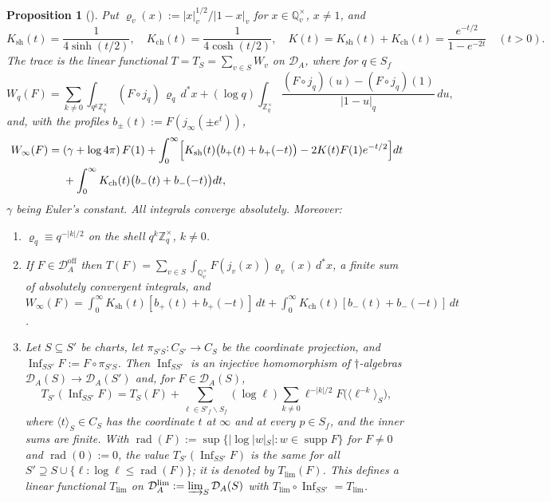 \documentclass[11pt]{amsart}
\newtheorem{proposition}[theorem]{Proposition}
\theoremstyle{definition}
\newcommand{\Z}{\mathbb Z}
\newcommand{\Q}{\mathbb Q}
\newcommand{\supp}{\operatorname{supp}}
\newcommand{\Ksh}{K_{\mathrm{sh}}}
\newcommand{\Kch}{K_{\mathrm{ch}}}
\newcommand{\DA}{\mathcal D_A}
\newcommand{\Doff}{\mathcal D_A^{\mathrm{off}}}
\begin{document}
\begin{proposition}[{\cite[Lemmas~5.2 and~8.2, Definition~5.4,
Convention~5.5, Theorem~5.6, Theorems~8.3 and~8.4]{Companion}}]\label{prop:trace}
Put $\varrho_v(x):=|x|_v^{1/2}/|1-x|_v$ for $x\in\Q_v^\times$, $x\ne1$, and
\[
  \Ksh(t)=\frac1{4\sinh(t/2)},\quad \Kch(t)=\frac1{4\cosh(t/2)},\quad
  K(t)=\Ksh(t)+\Kch(t)=\frac{e^{-t/2}}{1-e^{-2t}}\quad(t>0).
\]
The trace is the linear functional $T=T_S=\sum_{v\in S}W_v$ on $\DA$, where
for $q\in S_f$
\begin{equation}\label{eq:localterms}
  W_q(F)=\sum_{k\ne0}\int_{q^k\Z_q^\times}(F\circ j_q)\,\varrho_q\,d^*x
   +(\log q)\int_{\Z_q^\times}\frac{(F\circ j_q)(u)-(F\circ j_q)(1)}{|1-u|_q}
     \,du,
\end{equation}
and, with the profiles $b_\pm(t):=F(j_\infty(\pm e^{t}))$,
\begin{equation}\label{eq:archterm}
\begin{aligned}
  W_\infty(F)={}&(\gamma+\log4\pi)\,F(1)
   +\int_0^\infty\Bigl[\Ksh(t)\bigl(b_+(t)+b_+(-t)\bigr)
     -2K(t)F(1)e^{-t/2}\Bigr]dt\\
   &+\int_0^\infty \Kch(t)\bigl(b_-(t)+b_-(-t)\bigr)dt ,
\end{aligned}
\end{equation}
$\gamma$ being Euler's constant. All integrals converge absolutely. Moreover:
\begin{enumerate}
\item[(a)] $\varrho_q\equiv q^{-|k|/2}$ on the shell $q^k\Z_q^\times$, $k\ne0$.
\item[(b)] If $F\in\Doff$ then
$T(F)=\sum_{v\in S}\int_{\Q_v^\times}F(j_v(x))\varrho_v(x)\,d^*x$, a finite sum of
absolutely convergent integrals, and
$W_\infty(F)=\int_0^\infty \Ksh(t)[b_+(t)+b_+(-t)]\,dt
+\int_0^\infty \Kch(t)[b_-(t)+b_-(-t)]\,dt$.
\item[(c)] Let $S\subseteq S'$ be charts, let $\pi_{S'S}:C_{S'}\to C_S$ be the
coordinate projection, and $\operatorname{Inf}_{SS'}F:=F\circ\pi_{S'S}$. Then
$\operatorname{Inf}_{SS'}$ is an injective homomorphism of $\dagger$-algebras
$\DA(S)\to\DA(S')$ and, for $F\in\DA(S)$,
\[
  T_{S'}(\operatorname{Inf}_{SS'}F)=T_S(F)
   +\sum_{\ell\in S'_f\smallsetminus S_f}(\log\ell)\sum_{k\ne0}\ell^{-|k|/2}
     F\bigl(\langle\ell^{-k}\rangle_S\bigr),
\]
where $\langle t\rangle_S\in C_S$ has the coordinate $t$ at $\infty$ and at
every $p\in S_f$, and the inner sums are finite. With
$\operatorname{rad}(F):=\sup\{|\log|w|_S|:w\in\supp F\}$ for $F\ne0$ and
$\operatorname{rad}(0):=0$, the value
$T_{S'}(\operatorname{Inf}_{SS'}F)$ is the same for all
$S'\supseteq S\cup\{\ell:\log\ell\le\operatorname{rad}(F)\}$; it is denoted
by $T_{\lim}(F)$. This defines a linear functional $T_{\lim}$ on
$\DA^{\lim}:=\varinjlim_S\DA(S)$ with
$T_{\lim}\circ\operatorname{Inf}_{SS'}=T_{\lim}$.
\end{enumerate}
\end{proposition}
\end{document}
